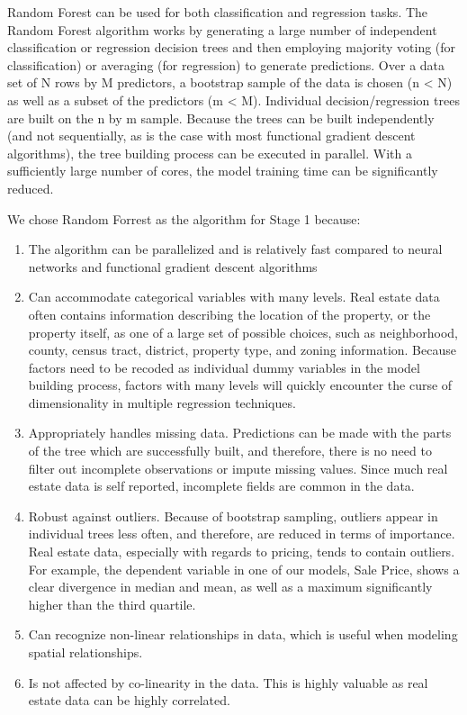\documentclass[12pt,]{article}
\providecommand{\tightlist}{%
  \setlength{\itemsep}{0pt}\setlength{\parskip}{0pt}}
\begin{document}
Random Forest can be used for both classification and regression tasks.
The Random Forest algorithm works by generating a large number of
independent classification or regression decision trees and then
employing majority voting (for classification) or averaging (for
regression) to generate predictions. Over a data set of N rows by M
predictors, a bootstrap sample of the data is chosen (n \textless{} N)
as well as a subset of the predictors (m \textless{} M). Individual
decision/regression trees are built on the n by m sample. Because the
trees can be built independently (and not sequentially, as is the case
with most functional gradient descent algorithms), the tree building
process can be executed in parallel. With a sufficiently large number of
cores, the model training time can be significantly reduced.

We chose Random Forrest as the algorithm for Stage 1 because:

\begin{enumerate}
\def\labelenumi{\arabic{enumi})}
\tightlist
\item
  The algorithm can be parallelized and is relatively fast compared to
  neural networks and functional gradient descent algorithms
\item
  Can accommodate categorical variables with many levels. Real estate
  data often contains information describing the location of the
  property, or the property itself, as one of a large set of possible
  choices, such as neighborhood, county, census tract, district,
  property type, and zoning information. Because factors need to be
  recoded as individual dummy variables in the model building process,
  factors with many levels will quickly encounter the curse of
  dimensionality in multiple regression techniques.
\item
  Appropriately handles missing data. Predictions can be made with the
  parts of the tree which are successfully built, and therefore, there
  is no need to filter out incomplete observations or impute missing
  values. Since much real estate data is self reported, incomplete
  fields are common in the data.
\item
  Robust against outliers. Because of bootstrap sampling, outliers
  appear in individual trees less often, and therefore, are reduced in
  terms of importance. Real estate data, especially with regards to
  pricing, tends to contain outliers. For example, the dependent
  variable in one of our models, Sale Price, shows a clear divergence in
  median and mean, as well as a maximum significantly higher than the
  third quartile.
\item
  Can recognize non-linear relationships in data, which is useful when
  modeling spatial relationships.
\item
  Is not affected by co-linearity in the data. This is highly valuable
  as real estate data can be highly correlated.
\end{enumerate}
\end{document}
